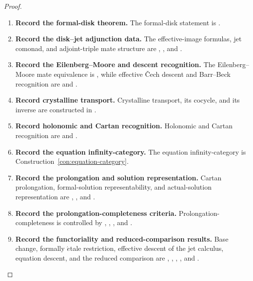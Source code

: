\begin{proof}
\leavevmode
\begin{enumerate}[label=\textup{(\arabic*)}]
    \item \textbf{Record the formal-disk theorem.}
The formal-disk statement is
.

    \item \textbf{Record the disk--jet adjunction data.}
The effective-image formulas, jet
comonad, and adjoint-triple mate structure are
,
, and
.

    \item \textbf{Record the Eilenberg--Moore and descent recognition.}
The Eilenberg--Moore mate equivalence is
, while effective \v{C}ech descent and
Barr--Beck recognition are
 and
.

    \item \textbf{Record crystalline transport.}
Crystalline transport, its cocycle, and its
inverse are constructed in
.

    \item \textbf{Record holonomic and Cartan recognition.}
Holonomic and Cartan recognition are
 and
.

    \item \textbf{Record the equation infinity-category.}
The equation infinity-category is
Construction~\ref{con:equation-category}.

    \item \textbf{Record the prolongation and solution representation.}
Cartan prolongation,
formal-solution representability, and actual-solution representation are
,
, and
.

    \item \textbf{Record the prolongation-completeness criteria.}
Prolongation-completeness is controlled by
,
,
, and
.

    \item \textbf{Record the functoriality and reduced-comparison results.}
Base change, formally \(\acute{e}\)tale restriction, effective descent of
the jet calculus, equation descent, and the reduced comparison are
,
,
,
, and
.


\end{enumerate}
\end{proof}
